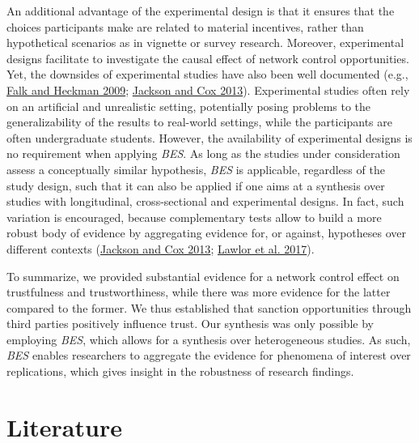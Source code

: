 \documentclass[
  11pt,
]{article}
\begin{document}
An additional advantage of the experimental design is that it ensures that the choices participants make are related to material incentives, rather than hypothetical scenarios as in vignette or survey research.
Moreover, experimental designs facilitate to investigate the causal effect of network control opportunities.
Yet, the downsides of experimental studies have also been well documented (e.g., \protect\hyperlink{ref-falk_heckman_experiments_2009}{Falk and Heckman 2009}; \protect\hyperlink{ref-jackson_cox_experimental_2013}{Jackson and Cox 2013}).
Experimental studies often rely on an artificial and unrealistic setting, potentially posing problems to the generalizability of the results to real-world settings, while the participants are often undergraduate students.
However, the availability of experimental designs is no requirement when applying \emph{BES}.
As long as the studies under consideration assess a conceptually similar hypothesis, \emph{BES} is applicable, regardless of the study design, such that it can also be applied if one aims at a synthesis over studies with longitudinal, cross-sectional and experimental designs.
In fact, such variation is encouraged, because complementary tests allow to build a more robust body of evidence by aggregating evidence for, or against, hypotheses over different contexts (\protect\hyperlink{ref-jackson_cox_experimental_2013}{Jackson and Cox 2013}; \protect\hyperlink{ref-lawlor_triangulation_2017}{Lawlor et al. 2017}).

To summarize, we provided substantial evidence for a network control effect on trustfulness and trustworthiness, while there was more evidence for the latter compared to the former.
We thus established that sanction opportunities through third parties positively influence trust.
Our synthesis was only possible by employing \emph{BES}, which allows for a synthesis over heterogeneous studies.
As such, \emph{BES} enables researchers to aggregate the evidence for phenomena of interest over replications, which gives insight in the robustness of research findings.

\hypertarget{literature}{%
\section{Literature}\label{literature}}

\setlength{\parindent}{-0.2in}
\setlength{\leftskip}{0.2in}

\noindent
\end{document}

